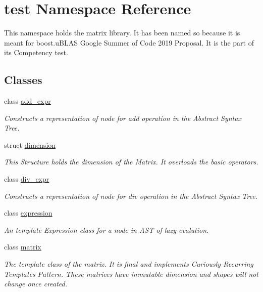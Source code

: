 \hypertarget{namespacetest}{}\section{test Namespace Reference}
\label{namespacetest}


This namespace holds the matrix library. It has been named so because it is meant for boost.\+u\+B\+L\+AS Google Summer of Code 2019 Proposal. It is the part of it\textquotesingle{}s Competency test.  


\subsection*{Classes}
\begin{DoxyCompactItemize}
\item 
class \mbox{\hyperlink{classtest_1_1add__expr}{add\+\_\+expr}}
\begin{DoxyCompactList}\small\item\em Constructs a representation of node for add operation in the Abstract Syntax Tree. \end{DoxyCompactList}\item 
struct \mbox{\hyperlink{structtest_1_1dimension}{dimension}}
\begin{DoxyCompactList}\small\item\em This Structure holds the dimension of the Matrix. It overloads the basic operators. \end{DoxyCompactList}\item 
class \mbox{\hyperlink{classtest_1_1div__expr}{div\+\_\+expr}}
\begin{DoxyCompactList}\small\item\em Constructs a representation of node for div operation in the Abstract Syntax Tree. \end{DoxyCompactList}\item 
class \mbox{\hyperlink{classtest_1_1expression}{expression}}
\begin{DoxyCompactList}\small\item\em An template Expression class for a node in A\+ST of lazy evalution. \end{DoxyCompactList}\item 
class \mbox{\hyperlink{classtest_1_1matrix}{matrix}}
\begin{DoxyCompactList}\small\item\em The template class of the matrix. It is final and implements Curiously Recurring Templates Pattern. These matrices have immutable dimension and shapes will not change once created. \end{DoxyCompactList}\item 

\end{DoxyCompactItemize}
